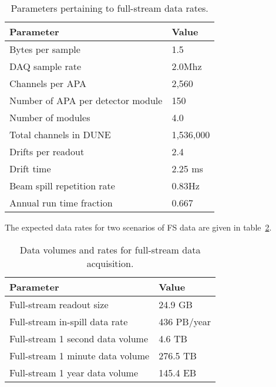 \begin{table}[ht!]
	\centering
	\begin{tabular}{| p{3in} | p{2.5in} |}
		\hline

	\textbf{Parameter} & \textbf{Value} \\ \hline
	
	Bytes per sample & 1.5 \\ \hline
	
	DAQ sample rate & 2.0Mhz \\ \hline
	
	Channels per APA & 2,560 \\ \hline
	
	Number of APA per detector module & 150 \\ \hline
	
	Number of modules & 4.0 \\ \hline
	
	Total channels in DUNE & 1,536,000 \\ \hline
	
	Drifts per readout & 2.4 \\ \hline
	
	Drift time & 2.25 ms \\ \hline
	
	Beam spill repetition rate & 0.83Hz \\ \hline
	
	Annual run time fraction & 0.667 \\ \hline
	\end{tabular}
	\caption{Parameters pertaining to full-stream data rates.}
	\label{tab:full-stream-parameters}
\end{table}


The expected data rates for two scenarios of FS data are given
in table~\ref{tab:full-stream-volume}.


\begin{table}[ht!]
	\centering
	\begin{tabular}{| p{3in} | p{2.5in} |}
		\hline	
	
	\textbf{Parameter} & \textbf{Value} \\ \hline
	Full-stream readout size & 24.9 GB \\ \hline
	Full-stream in-spill data rate & 436 PB/year \\ \hline
	Full-stream 1 second data volume & 4.6 TB \\
	Full-stream 1 minute data volume & 276.5 TB \\	\hline
	Full-stream 1 year data volume & 145.4 EB \\ \hline
	\end{tabular}
	\caption{Data volumes and rates for full-stream data acquisition.}
	\label{tab:full-stream-volume}
\end{table}



